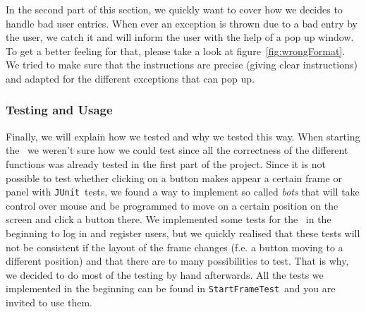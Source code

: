 In the second part of this section, we quickly want to cover how we decides to handle bad user 
entries. When ever an exception is thrown due to a bad entry by the user, we catch it and will inform 
the user with the help of a pop up window. To get a better feeling for that, please take a look at 
figure~\ref{fig:wrongFormat}. We tried to make sure that the instructions are precise (giving clear 
instructions) and adapted for the different exceptions that can pop up.

\subsubsection{Testing and Usage} %
\label{ssub:testing_and_usage}

Finally, we will explain how we tested and why we tested this way. 
When starting the \GUI~we weren't sure how we could test since all the correctness of the different 
functions was already tested in the first part of the project. Since it is not possible to test 
whether clicking on a button makes appear a certain frame or panel with \lstinline|JUnit|~tests, we 
found a way to implement so called \emph{bots} that will take control over mouse and be programmed to 
move on a certain position on the screen and click a button there. We implemented some tests for the 
\StFra~in the beginning to log in and register users, but we quickly realised that these tests will 
not be consistent if the layout of the frame changes (f.e. a button moving to a different position) 
and that there are to many possibilities to test. That is why, we decided to do most of the testing 
by hand afterwards. All the tests we implemented in the beginning can be found in 
\lstinline|StartFrameTest|~and you are invited to use them.



